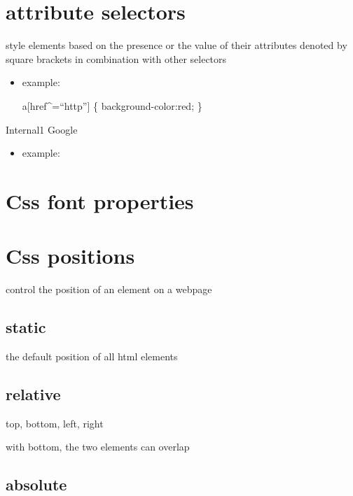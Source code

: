\documentclass[
]{book}
\providecommand{\tightlist}{%
  \setlength{\itemsep}{0pt}\setlength{\parskip}{0pt}}
\begin{document}
\hypertarget{attribute-selectors}{%
\section{attribute selectors}\label{attribute-selectors}}

style elements based on the presence or the value of their attributes
denoted by square brackets
in combination with other selectors

\begin{itemize}
\tightlist
\item
  example:

  a{[}href\^{}=``http''{]} \{
  background-color:red;
  \}
\end{itemize}

Internal1
Google

\begin{itemize}
\tightlist
\item
  example:
\end{itemize}

\hypertarget{css-font-properties}{%
\section{Css font properties}\label{css-font-properties}}

\hypertarget{css-positions}{%
\section{Css positions}\label{css-positions}}

control the position of an element on a webpage

\hypertarget{static}{%
\subsection{static}\label{static}}

the default position of all html elements

\hypertarget{relative}{%
\subsection{relative}\label{relative}}

top, bottom, left, right

\hypertarget{secondDiv}{}

with bottom, the two elements can overlap

\hypertarget{absolute}{%
\subsection{absolute}\label{absolute}}
\end{document}
